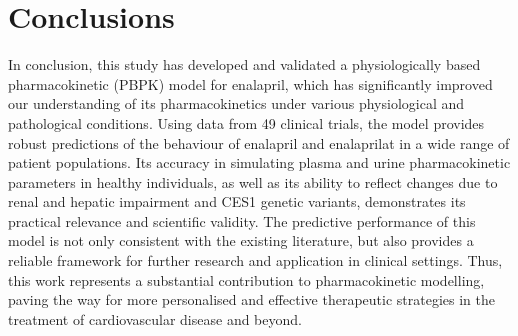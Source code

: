 \documentclass[pharmaceutics,article,submit,pdftex,moreauthors]{Definitions/mdpi}
\begin{document}
\section{Conclusions}
In conclusion, this study has developed and validated a physiologically based pharmacokinetic (PBPK) model for enalapril, which has significantly improved our understanding of its pharmacokinetics under various physiological and pathological conditions. Using data from 49 clinical trials, the model provides robust predictions of the behaviour of enalapril and enalaprilat in a wide range of patient populations. Its accuracy in simulating plasma and urine pharmacokinetic parameters in healthy individuals, as well as its ability to reflect changes due to renal and hepatic impairment and CES1 genetic variants, demonstrates its practical relevance and scientific validity. The predictive performance of this model is not only consistent with the existing literature, but also provides a reliable framework for further research and application in clinical settings. Thus, this work represents a substantial contribution to pharmacokinetic modelling, paving the way for more personalised and effective therapeutic strategies in the treatment of cardiovascular disease and beyond.









\end{document}
